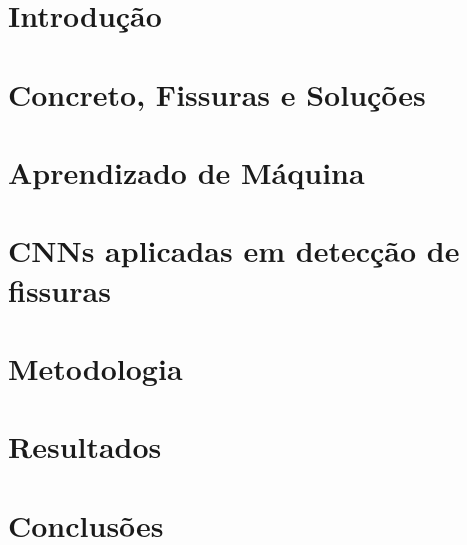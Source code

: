 \documentclass[tcc2, pos-defesa, english, brazil]{packages/ufgrc}
\begin{document}
\textual

\chapter{Introdução}
\label{chapter:introducao}


\chapter{Concreto, Fissuras e Soluções}
\label{chapter:concreto}


\chapter{Aprendizado de Máquina}
\label{chapter:deep_learn}


\chapter{CNNs aplicadas em detecção de fissuras}
\label{chapter:correlatos}



\chapter{Metodologia}
\label{chapter:metodologia}


\chapter{Resultados}
\label{chapter:resultados}


\chapter{Conclusões} %
\label{chapter:conclusao}


% 

\postextual


\end{document}
